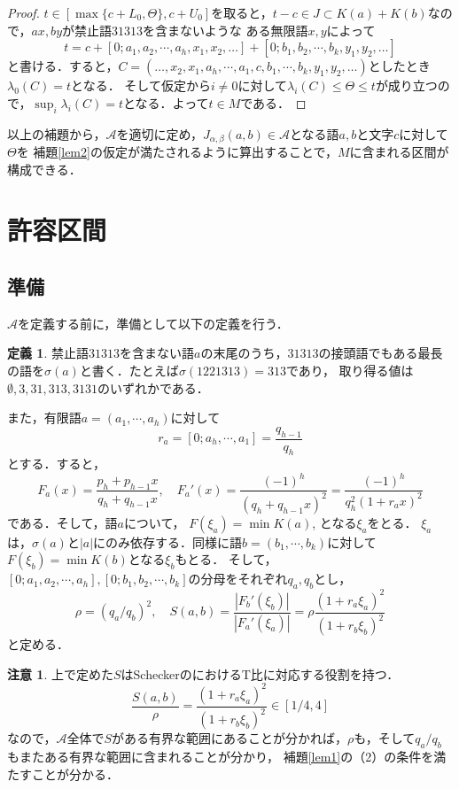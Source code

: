 \documentclass[10pt,a4paper]{ujarticle}
\theoremstyle{definition}
\newtheorem{definition}{定義}
\newtheorem{remark}{注意}
\begin{document}
\begin{proof}
    $t \in [\max\{c + L_0, \Theta\}, c + U_0]$を取ると，$t - c \in J \subset K(a) + K(b)$なので，$ax, by$が禁止語$31313$を含まないような
    ある無限語$x,y$によって
    \[
    t = c + [0; a_1, a_2, \cdots, a_h, x_1, x_2,\dots] + [0; b_1, b_2, \cdots, b_k, y_1, y_2, \dots]
    \]
    と書ける．すると，$C = (\dots, x_2, x_1, a_h,\cdots, a_1, c, b_1,\cdots, b_k, y_1, y_2,\dots)$としたとき$\lambda_0(C) = t$となる．
    そして仮定から$i\neq 0$に対して$\lambda_i(C) \le \Theta \le t$が成り立つので，$\sup_i \lambda_i(C) = t$となる．よって$t \in M$である．
\end{proof}
以上の補題から，$\mathcal{A}$を適切に定め，$J_{\alpha, \beta}(a,b)\in \mathcal{A}$となる語$a, b$と文字$c$に対して$\Theta$を
補題\ref{lem2}の仮定が満たされるように算出することで，$M$に含まれる区間が構成できる．

\section{許容区間}
\subsection{準備}
$\mathcal{A}$を定義する前に，準備として以下の定義を行う．
\begin{definition}
    禁止語$31313$を含まない語$a$の末尾のうち，$31313$の接頭語でもある最長の語を$\sigma(a)$と書く．たとえば$\sigma(1221313) = 313$であり，
    取り得る値は$\emptyset, 3, 31, 313, 3131$のいずれかである．

    また，有限語$a = (a_1, \cdots , a_h)$に対して
    \[
    r_a = [0;a_h, \cdots, a_1] = \frac{q_{h-1}}{q_h}
    \]
    とする．すると，
    \[
    F_a(x) = \frac{p_h + p_{h-1}x}{q_h + q_{h-1}x}, \quad F_a'(x) = \frac{(-1)^h}{(q_h + q_{h-1}x)^2} 
    = \frac{(-1)^h}{q_h^2 (1 + r_ax)^2}
    \]
    である．そして，語$a$について，
    $F(\xi_a) = \min K(a)$, となる$\xi_a$をとる．
    $\xi_a$は，$\sigma(a)$と$|a|$にのみ依存する．同様に語$b = (b_1, \cdots, b_k)$に対して$F(\xi_b) = \min K(b)$となる$\xi_b$もとる．
    そして，$[0; a_1, a_2, \cdots, a_h], [0; b_1, b_2, \cdots, b_k]$の分母をそれぞれ$q_a, q_b$とし，
    \[
    \rho = (q_a / q_b)^2, \quad S(a,b) = \frac{|F_b'(\xi_b)|}{|F_a'(\xi_a)|} = \rho \frac{(1 + r_a\xi_a)^2}{(1 + r_b\xi_b)^2}
    \]
    と定める．
\end{definition}
\begin{remark}
    上で定めた$S$はSchecker\cite{schecker}のにおけるT比に対応する役割を持つ．
    \[
    \frac{S(a,b)}{\rho} = \frac{(1 + r_a\xi_a)^2}{(1 + r_b\xi_b)^2} \in [1/4, 4]
    \]
    なので，$\mathcal{A}$全体で$S$がある有界な範囲にあることが分かれば，$\rho$も，そして$q_a/ q_b$もまたある有界な範囲に含まれることが分かり，
    補題\ref{lem1}の（2）の条件を満たすことが分かる．
\end{remark}
\end{document}
